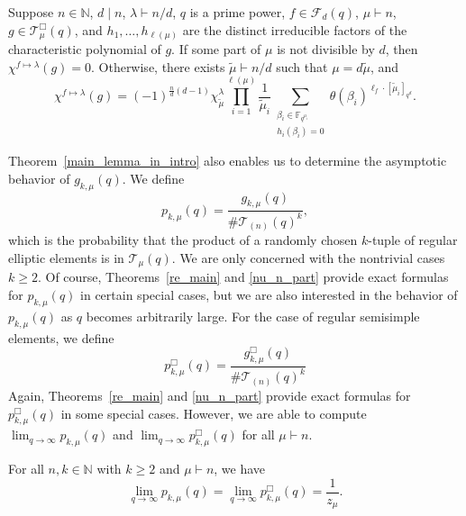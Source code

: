 \documentclass[Unicode,ALCO]{cedram}
\newcommand{\F}{\mathbb{F}}
\newcommand{\CF}{\mathcal{F}}
\newcommand{\N}{\mathbb{N}}
\newcommand{\CT}{\mathcal{T}}
\newcommand{\te}{\theta}
\begin{document}
\begin{theorem} \label{main_lemma_in_intro}
Suppose \(n \in \N\), \(d \mid n\), \(\lambda \vdash n/d\), \(q\) is a prime power, \(f \in \CF_d (q)\), \(\mu \vdash n\), \(g \in \CT_\mu^\Box (q)\), and \(h_1,\ldots,h_{\ell(\mu)}\) are the distinct irreducible factors of the characteristic polynomial of \(g\).
If some part of \(\mu\) is not divisible by \(d\), then \(\chi^{f \mapsto \lambda} (g) = 0\).
Otherwise, there exists \(\tilde{\mu} \vdash n/d\) such that \(\mu = d \tilde{\mu}\), and
\begin{equation}
\chi^{f \mapsto \lambda} (g)
= (-1)^{\tfrac{n}{d}(d-1)}
\chi^\lambda_{\tilde{\mu}}
\prod_{i = 1}^{\ell(\mu)}
\frac{1}{\tilde{\mu}_i}
\sum_{\substack{ \beta_i \in \F_{q^{\mu_i}} \\ h_i(\beta_i) = 0}} \te (\beta_i)^{\ell_f \cdot [\tilde{\mu}_i]_{q^d}}.
\end{equation}
\end{theorem}




Theorem~\ref{main_lemma_in_intro} also enables us to determine the asymptotic behavior of \(g_{k,\mu} (q)\).
We define
\begin{equation}
p_{k,\mu} (q) = \frac{g_{k,\mu}(q)}{\# \CT_{(n)} (q)^k},
\end{equation}
which is the probability that the product of a randomly chosen \(k\)-tuple of regular elliptic elements is in \(\CT_\mu (q)\).
We are only concerned with the nontrivial cases \(k \geq 2\).
Of course, Theorems~\ref{re_main} and \ref{nu_n_part} provide exact formulas for \(p_{k,\mu} (q)\) in certain special cases, but we are also interested in the behavior of \(p_{k,\mu}(q)\) as \(q\) becomes arbitrarily large.
For the case of regular semisimple elements,
we define
\begin{equation}
\label{pBox_defs}
p_{k,\mu}^\Box (q) = \frac{g_{k,\mu}^\Box(q)}{\# \CT_{(n)} (q)^k}
\end{equation}
Again, Theorems~\ref{re_main} and \ref{nu_n_part} provide exact formulas for \(p^\Box_{k,\mu} (q)\) in some special cases.
However, we are able to compute \(\lim_{q \to \infty} p_{k,\mu} (q)\) and \(\lim_{q \to \infty} p_{k,\mu}^\Box (q)\) for all \(\mu \vdash n\).

\begin{theorem}
\label{intro_version_p}
For all \(n,k \in \N\) with \(k \geq 2\) and \(\mu \vdash n\), we have
\begin{equation}
\lim_{q \to \infty} p_{k,\mu}      (q) =
\lim_{q \to \infty} p_{k,\mu}^\Box (q) =
\frac{1}{z_\mu}.
\end{equation}
\end{theorem}
\end{document}
